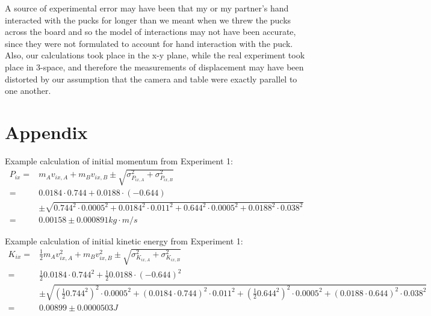 \documentclass[11pt]{article}
\begin{document}
A source of experimental error may have been that my or my partner's hand interacted with the pucks for longer than we meant when we threw the pucks across the board and so the model of interactions may not have been accurate, since they were not formulated to account for hand interaction with the puck. Also, our calculations took place in the x-y plane, while the real experiment took place in 3-space, and therefore the measurements of displacement may have been distorted by our assumption that the camera and table were exactly parallel to one another.




\section{Appendix}
Example calculation of initial momentum from Experiment 1:\\
\begin{align*}
P_{ix} =& m_A v_{ix,A} + m_B v_{ix,B} \pm \sqrt{\sigma_{P_{ix,A}}^2+\sigma_{P_{ix,B}}^2} \\
=& 0.0184\cdot0.744 + 0.0188\cdot(-0.644) \\
&\pm \sqrt{0.744^2\cdot0.0005^2+0.0184^2\cdot0.011^2+0.644^2\cdot0.0005^2+0.0188^2\cdot0.038^2} \\
=& 0.00158\pm0.000891 kg\cdot m/s
\end{align*}

Example calculation of initial kinetic energy from Experiment 1:\\
\begin{align*}
K_{ix} =& \frac{1}{2}m_A v_{ix,A}^2 + m_B v_{ix,B}^2 \pm \sqrt{\sigma_{K_{ix,A}}^2+\sigma_{K_{ix,B}}^2} \\
=& \frac{1}{2}0.0184\cdot0.744^2 + \frac{1}{2}0.0188\cdot(-0.644)^2 \\
&\pm \sqrt{(\frac{1}{2}0.744^2)^2\cdot0.0005^2+(0.0184\cdot0.744)^2\cdot0.011^2+(\frac{1}{2}0.644^2)^2\cdot0.0005^2+(0.0188\cdot0.644)^2\cdot0.038^2} \\
=& 0.00899\pm0.0000503 J
\end{align*}
\end{document}
